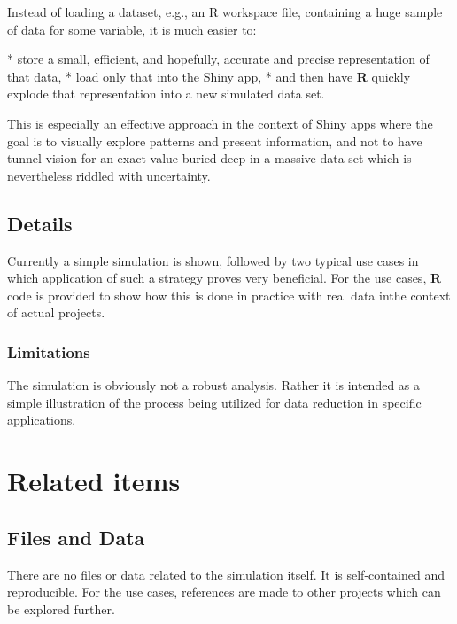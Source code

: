 \documentclass{article}\usepackage[]{graphicx}\usepackage[]{color}
\begin{document}
Instead of loading a dataset, e.g., an R workspace file, containing a huge sample of data for some variable,
it is much easier to:

* store a small, efficient, and hopefully, accurate and precise representation of that data,
* load only that into the Shiny app,
* and then have \textbf{R} quickly explode that representation into a new simulated data set.

This is especially an effective approach in the context of Shiny apps where the goal is to visually explore patterns and present information,
and not to have tunnel vision for an exact value buried deep in a massive data set which is nevertheless riddled with uncertainty.

\subsection{Details}
Currently a simple simulation is shown, followed by two typical use cases in which application of such a strategy proves very beneficial.
For the use cases, \textbf{R} code is provided to show how this is done in practice with real data inthe context of actual projects.

\subsubsection{Limitations}
The simulation is obviously not a robust analysis.
Rather it is intended as a simple illustration of the process being utilized for data reduction in specific applications.

\section{Related items}

\subsection{Files and Data}
There are no files or data related to the simulation itself.
It is self-contained and reproducible.
For the use cases, references are made to other projects which can be explored further.
\end{document}
